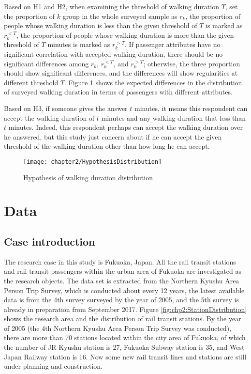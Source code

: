 Based on H1 and H2, when examining the threshold of walking duration $T$, set the proportion of $k$ group in the whole surveyed sample as $r_k$, the proportion of people whose walking duration is less than the given threshold of $T$ is marked as $r_{k}^{<T}$, the proportion of people whose walking duration is more than the given threshold of $T$ minutes is marked as $r_{k}^{>T}$. If passenger attributes have no significant correlation with accepted walking duration, there should be no significant differences among $r_k$, $r_{k}^{<T}$, and $r_{k}^{>T}$; otherwise, the three proportion should show significant differences, and the differences will show regularities at different threshold $T$. Figure \ref{fig:chp2:Chp2HypothesisOfWalkingDurationDistribution} shows the expected differences in the distribution of surveyed walking duration in terms of passengers with different attributes. 

Based on H3, if someone gives the answer $t$ minutes, it means this respondent can accept the walking duration of $t$ minutes and any walking duration that less than $t$ minutes. Indeed, this respondent perhaps can accept the walking duration over he answered, but this study just concern about if he can accept the given threshold of the walking duration other than how long he can accept.

\begin{figure}[htbp]
	\centering
	\texttt{[image: chapter2/HypothesisDistribution]}
	\caption{Hypothesis of walking duration distribution}
	\label{fig:chp2:Chp2HypothesisOfWalkingDurationDistribution}
\end{figure}

%
\section{Data}
%
\subsection{Case introduction}
The research case in this study is Fukuoka, Japan. All the rail transit stations and rail transit passengers within the urban area of Fukuoka are investigated as the research objects. The data set is extracted from the Northern Kyushu Area Person Trip Survey, which is conducted about every 12 years, the latest available data is from the 4th survey surveyed by the year of 2005, and the 5th survey is already in preparation from September 2017. Figure \ref{fig:chp2:StationDistribution} shows the research area and the distribution of rail transit stations. By the year of 2005 (the 4th Northern Kyushu Area Person Trip Survey was conducted), there are more than 70 stations located within the city area of Fukuoka, of which the number of JR Kyushu station is 27, Fukuoka Subway station is 35, and West Japan Railway station is 16. Now some new rail transit lines and stations are still under planning and construction. 

